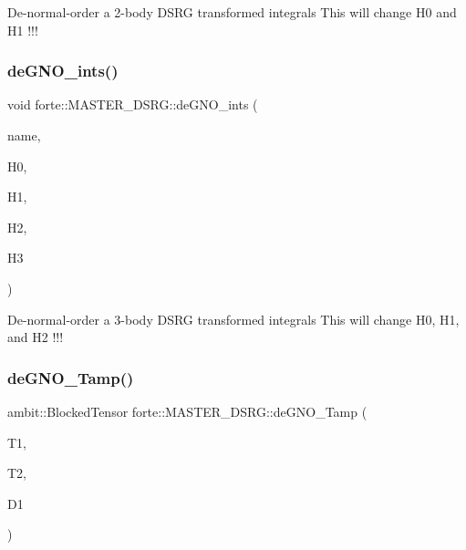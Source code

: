 De-\/normal-\/order a 2-\/body D\+S\+RG transformed integrals This will change H0 and H1 !!! \mbox{\label{classforte_1_1_m_a_s_t_e_r___d_s_r_g_a48f26210aabd7ea4600205c75c2bf883}} 
\subsubsection{\texorpdfstring{de\+G\+N\+O\+\_\+ints()}{deGNO\_ints()}\hspace{0.1cm}{\footnotesize\ttfamily [2/2]}}
{\footnotesize\ttfamily void forte\+::\+M\+A\+S\+T\+E\+R\+\_\+\+D\+S\+R\+G\+::de\+G\+N\+O\+\_\+ints (\begin{DoxyParamCaption}\item[{const std\+::string \&}]{name,  }\item[{double \&}]{H0,  }\item[{Blocked\+Tensor \&}]{H1,  }\item[{Blocked\+Tensor \&}]{H2,  }\item[{Blocked\+Tensor \&}]{H3 }\end{DoxyParamCaption})\hspace{0.3cm}{\ttfamily [protected]}}

De-\/normal-\/order a 3-\/body D\+S\+RG transformed integrals This will change H0, H1, and H2 !!! \mbox{\label{classforte_1_1_m_a_s_t_e_r___d_s_r_g_a5e59459adbaed7541848913a218471ac}} 
\subsubsection{\texorpdfstring{de\+G\+N\+O\+\_\+\+Tamp()}{deGNO\_Tamp()}}
{\footnotesize\ttfamily ambit\+::\+Blocked\+Tensor forte\+::\+M\+A\+S\+T\+E\+R\+\_\+\+D\+S\+R\+G\+::de\+G\+N\+O\+\_\+\+Tamp (\begin{DoxyParamCaption}\item[{Blocked\+Tensor \&}]{T1,  }\item[{Blocked\+Tensor \&}]{T2,  }\item[{Blocked\+Tensor \&}]{D1 }\end{DoxyParamCaption})\hspace{0.3cm}{\ttfamily [protected]}}

